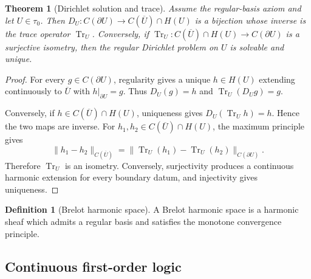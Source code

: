 \documentclass{amsart}
\newtheorem{theorem}{Theorem}[section]
\theoremstyle{definition}
\newtheorem{definition}{Definition}[section]
\theoremstyle{remark}
\newcommand{\dotminus}{\mathbin{\dot{-}}}
\numberwithin{equation}{section}
\begin{document}
	
	\begin{theorem}[Dirichlet solution and trace]\label{thm: Dirichlet solution and trace} Assume the regular-basis axiom and let $U\in\tau_0$. Then $D_U:C(\partial U)\to C(\overline U)\cap H(U)$ is a bijection whose inverse is the trace operator $\operatorname{Tr}_U$. Conversely, if $\operatorname{Tr}_U:C(\overline U)\cap H(U)\to C(\partial U)$ is a surjective isometry, then the regular Dirichlet problem on $U$ is solvable and unique.
	\end{theorem}
	\begin{proof}
		For every $g\in C(\partial U)$, regularity gives a unique $h\in H(U)$ extending continuously to $\overline U$ with $h|_{\partial U}=g$. Thus $D_U(g)=h$ and $\operatorname{Tr}_U(D_Ug)=g$.
		
		Conversely, if $h\in C(\overline U)\cap H(U)$, uniqueness gives $D_U(\operatorname{Tr}_Uh)=h$. Hence the two maps are inverse. For $h_1,h_2\in C(\overline U)\cap H(U)$, the maximum principle gives
		$$
		\|h_1-h_2\|_{C(\overline U)}
		=
		\|\operatorname{Tr}_U(h_1)-\operatorname{Tr}_U(h_2)\|_{C(\partial U)}.
		$$
		Therefore $\operatorname{Tr}_U$ is an isometry. Conversely, surjectivity produces a continuous harmonic extension for every boundary datum, and injectivity gives uniqueness.
	\end{proof}
	
	
	\begin{definition}[Brelot harmonic space] A Brelot harmonic space is a harmonic sheaf which admits a regular basis and satisfies the monotone convergence principle.
	\end{definition}
	
	\subsection{Continuous first-order logic}
	
	
\end{document}
